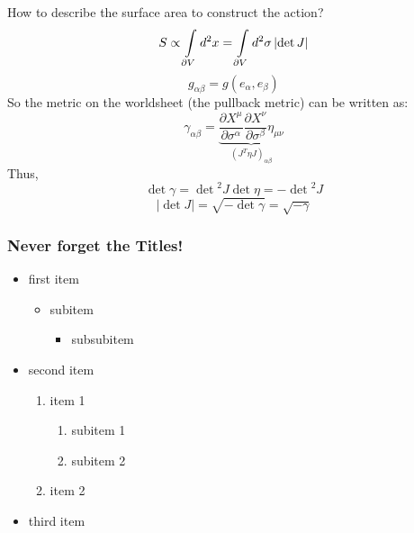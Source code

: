 \documentclass[aspectratio=169]{beamer}
\begin{document}
	\begin{frame}
		How to describe the surface area to construct the action?
		\begin{equation}
			S \propto \int\displaylimits_{\partial V} d^2x = \int\displaylimits_{\partial V}d^2\sigma \left| \det J \right|
		\end{equation}
		\color{red}{For this, first remember that any metric is given by:}
		\begin{equation*}
			g_{\alpha\beta} = g(e_\alpha,e_\beta)
		\end{equation*}
		\color{black}
		So the metric on the worldsheet (the pullback metric) can be written as:
		\begin{equation*}
			\gamma_{\alpha\beta} = \underbrace{\frac{\partial X^\mu}{\partial\sigma^\alpha} \frac{\partial X^\nu}{\partial\sigma^\beta} \eta_{\mu\nu}}_{(J^T \eta J)_{\alpha\beta}}
		\end{equation*}
		Thus,
		\begin{equation*}
			\det \gamma = \det{^2} J \det \eta = - \det{^2} J
		\end{equation*}
		\begin{equation*}
			\left| \det J \right| = \sqrt{-\det\gamma} = \sqrt{-\gamma}
		\end{equation*}
	\end{frame}

	
	
	\begin{frame}
		\frametitle{Never forget the Titles!}
		\begin{itemize}
			\item<1,2,3,4,5> first item 
			\begin{itemize}
				\item<2,3,4,5> subitem
				\begin{itemize}
					\item<3,4,5> subsubitem
				\end{itemize}
			\end{itemize}
			\item<4,5>second item
			\begin{enumerate}
				\item item 1
				\begin{enumerate}
					\item subitem 1
					\item subitem 2
				\end{enumerate}
				\item item 2
			\end{enumerate}
			\item<5>third item
		\end{itemize}	
	\end{frame}
\end{document}
